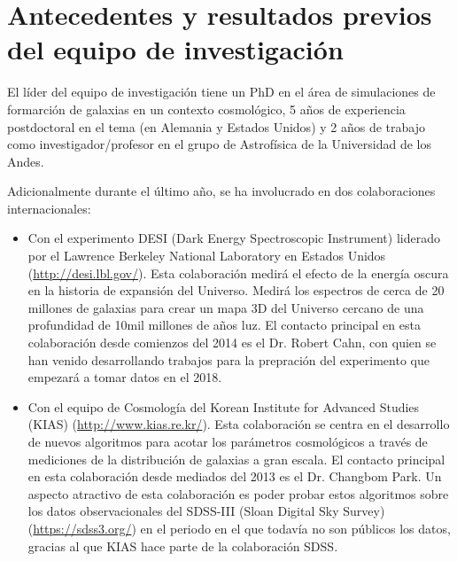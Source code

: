 \section{Antecedentes y resultados previos del equipo de
  investigaci\'on} 

El l\'ider del equipo de investigaci\'on tiene un PhD en el \'area de simulaciones de formarci\'on de galaxias en un  contexto cosmol\'ogico, 5 a\~nos
de experiencia postdoctoral en el tema (en Alemania y Estados Unidos)
y 2 a\~nos de trabajo como investigador/profesor en el grupo de
Astrof\'isica de la Universidad de los Andes.


Adicionalmente durante el \'ultimo a\~no, se ha involucrado en dos
colaboraciones internacionales: 

\begin{itemize}
\item Con el experimento DESI
(Dark Energy Spectroscopic Instrument) liderado por el Lawrence
Berkeley National Laboratory en Estados Unidos
(\url{http://desi.lbl.gov/}). Esta colaboraci\'on medir\'a el efecto
de la energ\'ia oscura en la historia de expansi\'on del
Universo. Medir\'a los espectros de cerca de 20 millones de galaxias
para crear un mapa 3D del Universo cercano de una profundidad de 10mil
millones de a\~nos luz. El contacto principal en esta colaboraci\'on
desde comienzos del 2014
es el Dr. Robert Cahn, con quien se han venido desarrollando trabajos
para la prepraci\'on del experimento que empezar\'a a tomar datos en
el 2018.

\item Con el equipo de Cosmolog\'ia del Korean Institute for Advanced
  Studies (KIAS) (\url{http://www.kias.re.kr/}). Esta colaboraci\'on
  se centra en el desarrollo de nuevos 
  algoritmos para acotar los par\'ametros cosmol\'ogicos a trav\'es de
  mediciones de la distribuci\'on de galaxias a gran escala. El
  contacto principal en esta colaboraci\'on desde mediados del 2013 es
  el Dr. Changbom Park. Un aspecto atractivo de esta colaboraci\'on es
  poder probar estos algoritmos sobre los datos observacionales del
  SDSS-III (Sloan Digital  Sky Survey) (\url{https://sdss3.org/}) en
  el periodo en el que todav\'ia no son p\'ublicos los  datos, gracias
  al que KIAS hace parte de la colaboraci\'on SDSS. 

\end{itemize}

